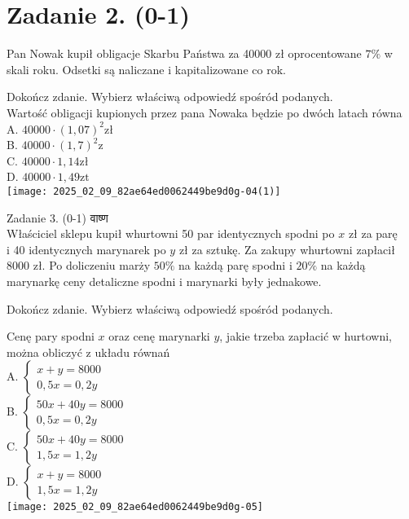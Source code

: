 \documentclass[10pt]{article}
\begin{document}
\section*{Zadanie 2. (0-1)}
Pan Nowak kupił obligacje Skarbu Państwa za 40000 zł oprocentowane \(7 \%\) w skali roku. Odsetki są naliczane i kapitalizowane co rok.

Dokończ zdanie. Wybierz właściwą odpowiedź spośród podanych.\\
Wartość obligacji kupionych przez pana Nowaka będzie po dwóch latach równa\\
A. \(40000 \cdot(1,07)^{2} \mathrm{zł}\)\\
B. \(40000 \cdot(1,7)^{2} \mathrm{z}\)\\
C. \(40000 \cdot 1,14 \mathrm{zł}\)\\
D. \(40000 \cdot 1,49 \mathrm{zt}\)\\
\texttt{[image: 2025\_02\_09\_82ae64ed0062449be9d0g-04(1)]}

Zadanie 3. (0-1) वाष्ण\\
Właściciel sklepu kupił whurtowni 50 par identycznych spodni po \(x\) zł za parę\\
i 40 identycznych marynarek po \(y\) zł za sztukę. Za zakupy whurtowni zapłacił 8000 zł. Po doliczeniu marży \(50 \%\) na każdą parę spodni i \(20 \%\) na każdą marynarkę ceny detaliczne spodni i marynarki były jednakowe.

Dokończ zdanie. Wybierz właściwą odpowiedź spośród podanych.

Cenę pary spodni \(x\) oraz cenę marynarki \(y\), jakie trzeba zapłacić w hurtowni, można obliczyć z układu równań\\
A. \(\left\{\begin{array}{l}x+y=8000 \\ 0,5 x=0,2 y\end{array}\right.\)\\
B. \(\left\{\begin{array}{l}50 x+40 y=8000 \\ 0,5 x=0,2 y\end{array}\right.\)\\
C. \(\left\{\begin{array}{l}50 x+40 y=8000 \\ 1,5 x=1,2 y\end{array}\right.\)\\
D. \(\left\{\begin{array}{l}x+y=8000 \\ 1,5 x=1,2 y\end{array}\right.\)\\
\texttt{[image: 2025\_02\_09\_82ae64ed0062449be9d0g-05]}
\end{document}
